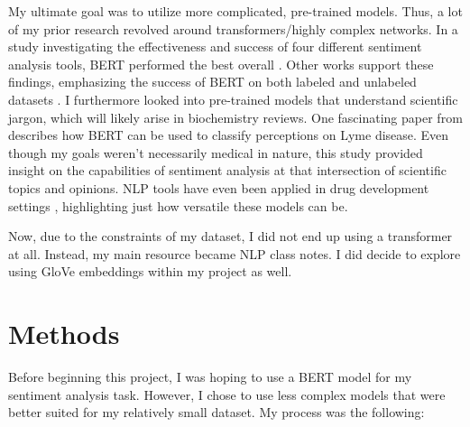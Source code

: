 \documentclass[11pt,a4paper]{article}
\begin{document}
My ultimate goal was to utilize more complicated, pre-trained models. Thus, a lot of my prior research revolved around transformers/highly complex networks. In a study investigating the effectiveness and success of four different sentiment analysis tools, BERT performed the best overall \citep{Alaparthi_bert}. Other works support these findings, emphasizing the success of BERT on both labeled and unlabeled datasets \citep{Chakraborty_unlabeled}. I furthermore looked into pre-trained models that understand scientific jargon, which will likely arise in biochemistry reviews. One fascinating paper from \citet{Susnjak_lyme} describes how BERT can be used to classify perceptions on Lyme disease. Even though my goals weren't necessarily medical in nature, this study provided insight on the capabilities of sentiment analysis at that intersection of scientific topics and opinions. NLP tools  have even been applied in drug development settings \citep{Bhatnagar_drug}, highlighting just how versatile these models can be.

Now, due to the constraints of my dataset, I did not end up using a transformer at all. Instead, my main resource became NLP class notes. I did decide to explore using GloVe embeddings \citep{pennington-etal-2014-glove} within my project as well.


\section{Methods}

Before beginning this project, I was hoping to use a BERT model for my sentiment analysis task. However, I chose to use less complex models that were better suited for my relatively small dataset. My process was the following:
\end{document}
